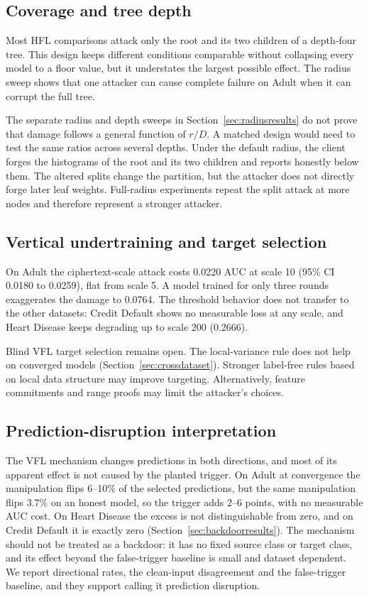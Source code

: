 \documentclass[11pt]{article}
\begin{document}
\subsection{Coverage and tree depth}

Most HFL comparisons attack only the root and its two children of a depth-four tree. This design keeps different conditions comparable without collapsing every model to a floor value, but it understates the largest possible effect. The radius sweep shows that one attacker can cause complete failure on Adult when it can corrupt the full tree.

The separate radius and depth sweeps in Section~\ref{sec:radiusresults} do not prove that damage follows a general function of $r/D$. A matched design would need to test the same ratios across several depths. Under the default radius, the client forges the histograms of the root and its two children and reports honestly below them. The altered splits change the partition, but the attacker does not directly forge later leaf weights. Full-radius experiments repeat the split attack at more nodes and therefore represent a stronger attacker.

\subsection{Vertical undertraining and target selection}

On Adult the ciphertext-scale attack costs 0.0220 AUC at scale 10 (95\% CI 0.0180 to 0.0259), flat from scale 5. A model trained for only three rounds exaggerates the damage to 0.0764. The threshold behavior does not transfer to the other datasets: Credit Default shows no measurable loss at any scale, and Heart Disease keeps degrading up to scale 200 (0.2666).

Blind VFL target selection remains open. The local-variance rule does not help on converged models (Section~\ref{sec:crossdataset}). Stronger label-free rules based on local data structure may improve targeting. Alternatively, feature commitments and range proofs may limit the attacker's choices.

\subsection{Prediction-disruption interpretation}

The VFL mechanism changes predictions in both directions, and most of its apparent effect is not caused by the planted trigger. On Adult at convergence the manipulation flips 6--10\% of the selected predictions, but the same manipulation flips 3.7\% on an honest model, so the trigger adds 2--6 points, with no measurable AUC cost. On Heart Disease the excess is not distinguishable from zero, and on Credit Default it is exactly zero (Section~\ref{sec:backdoorresults}). The mechanism should not be treated as a backdoor: it has no fixed source class or target class, and its effect beyond the false-trigger baseline is small and dataset dependent. We report directional rates, the clean-input disagreement and the false-trigger baseline, and they support calling it prediction disruption.
\end{document}
